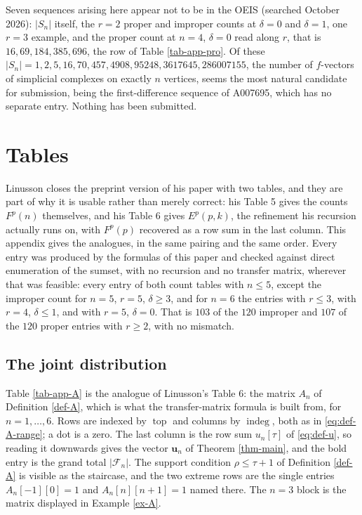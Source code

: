\documentclass[11pt, a4paper, abstract=yes]{scrartcl}
\theoremstyle{definition}
\theoremstyle{remark}
\theoremstyle{plain}
\newcommand{\vek}[1]{\boldsymbol{#1}}
\newcommand{\indeg}{\operatorname{indeg}}
\newcommand{\tp}{\operatorname{top}}
\let\autocite\cite
\begin{document}
Seven sequences arising here appear not to be in the OEIS (searched October 2026): \(|S_n|\) itself, the \(r=2\)
proper and improper counts at \(\delta=0\) and \(\delta=1\), one \(r=3\) example, and the proper
count at \(n=4\), \(\delta=0\) read along \(r\), that is \(16,69,184,385,696\), the row of
Table \ref{tab-app-pro}. Of
these \(|S_n|=1,2,5,16,70,457,4908,95248,3617645,286007155\), the number of \(f\)-vectors of
simplicial complexes on exactly \(n\) vertices, seems the most natural candidate for submission,
being the first-difference sequence of A007695, which has no separate entry. Nothing has been
submitted.

\appendix
\section{Tables}
\label{sec-app-tables}
\label{sec:app-tables}
Linusson closes the preprint version of his paper \autocite{Linusson1999preprint} with two tables,
and they are part of why it is usable rather than
merely correct: his Table 5 gives the counts \(F^p(n)\) themselves, and his Table 6 gives
\(E^p(p,k)\),
the refinement his recursion actually runs on, with \(F^p(p)\) recovered as a row sum in the last
column. This appendix gives the analogues, in the same pairing and the same order. Every entry
was produced by the formulas of this paper and checked against direct enumeration of the
sumset, with no recursion and no transfer matrix, wherever that was feasible: every entry of both
count tables with \(n\le5\), except the improper count for \(n=5\), \(r=5\), \(\delta\ge3\), and for
\(n=6\) the entries with \(r\le3\), with \(r=4\), \(\delta\le1\), and with \(r=5\), \(\delta=0\). That is
\(103\) of the \(120\) improper and \(107\) of the \(120\) proper entries with \(r\ge2\), with no
mismatch.
\subsection{The joint distribution}
\label{sec:orgf695fd1}

Table \ref{tab-app-A} is the analogue of Linusson's Table 6: the matrix \(A_n\) of
Definition \ref{def-A}, which is what the transfer-matrix formula is built from, for
\(n=1,\dots,6\). Rows are indexed by \(\tp\) and columns by \(\indeg\), both as in
\eqref{eq:def-A-range}; a dot is a zero. The last column is the row sum \(u_n[\tau]\) of
\eqref{eq:def-u}, so reading it downwards gives the vector \(\vek u_n\) of Theorem \ref{thm-main},
and the bold entry is the grand total \(\lvert\mathcal F_n\rvert\). The support condition
\(\rho\le\tau+1\) of Definition \ref{def-A} is visible as the staircase, and the two extreme rows
are the single entries \(A_n[-1][0]=1\) and \(A_n[n][n+1]=1\) named there. The \(n=3\) block is the
matrix displayed in Example \ref{ex-A}.
\end{document}
